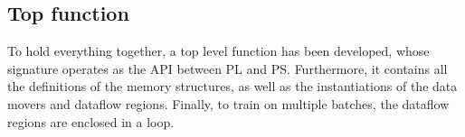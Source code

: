 
\subsection{Top function}
To hold everything together, a top level function has been developed, whose signature operates as the API between PL and PS. Furthermore, it contains all the definitions of the memory structures, as well as the instantiations of the data movers and dataflow regions. Finally, to train on multiple batches, the dataflow regions are enclosed in a loop.

